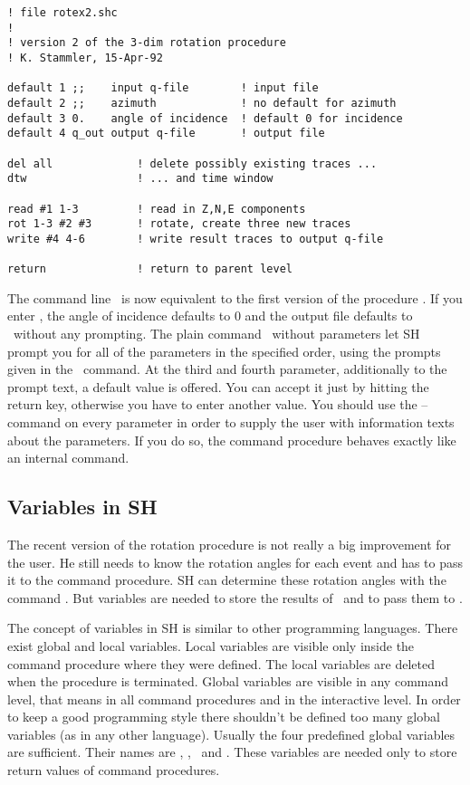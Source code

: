 \begin{verbatim}
! file rotex2.shc
!
! version 2 of the 3-dim rotation procedure
! K. Stammler, 15-Apr-92

default 1 ;;    input q-file        ! input file
default 2 ;;    azimuth             ! no default for azimuth
default 3 0.    angle of incidence  ! default 0 for incidence
default 4 q_out output q-file       ! output file

del all             ! delete possibly existing traces ...
dtw                 ! ... and time window

read #1 1-3         ! read in Z,N,E components
rot 1-3 #2 #3       ! rotate, create three new traces
write #4 4-6        ! write result traces to output q-file

return              ! return to parent level
\end{verbatim}

The command line \ is now equivalent
to the first version of the procedure .  If you enter
, the angle of incidence defaults to 0 and
the output file defaults to \ without
any prompting.  The plain command \ without
parameters let SH prompt you for all of the parameters in the
specified order, using the prompts given in the \
command.  At the third and fourth parameter,
additionally to the prompt text, a default value is offered.
You can accept it just by hitting the return key, otherwise you
have to enter another value.  You should use the
--command on every parameter in order to supply
the user with information texts about the parameters.  If you do
so, the command procedure behaves exactly like an internal
command.

\subsection{Variables in SH}
\label{sec:Variables}

The recent version of the rotation procedure is not really a
big improvement for the user.  He still needs to know the rotation
angles for each event and has to pass it to the command
procedure.  SH can determine these rotation angles with the
command .  But variables are needed to store the
results of \cmd{mdir}\ and to pass them to .

The concept of variables in SH is similar to other programming
languages.  There exist global and local variables.  Local
variables are visible only inside the command procedure where
they were defined.  The local variables are deleted when the
procedure is terminated.  Global variables are visible in any
command level, that means in all command procedures and in the
interactive level.  In order to keep a good programming style
there shouldn't be defined too many global variables (as in any other
language).  Usually the four predefined global variables are
sufficient.  Their names are , , \ and
.  These variables are needed only to store return values of
command procedures.

